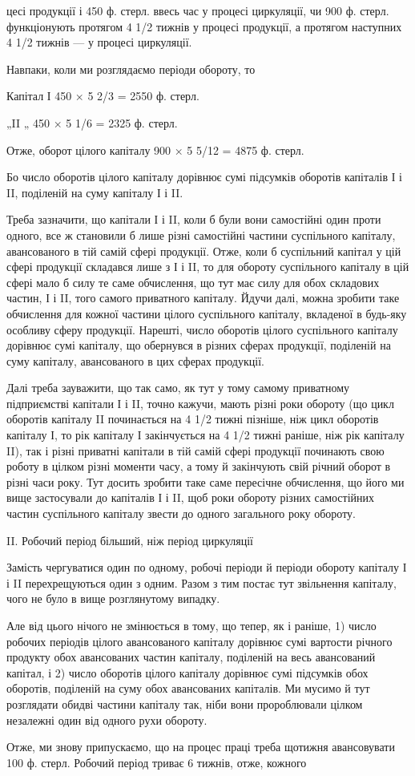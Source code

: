 цесі продукції і 450 ф. стерл. ввесь час у процесі циркуляції, чи 900 ф.
стерл. функціонують протягом 4 1/2 тижнів у процесі продукції, а протягом
наступних 4 1/2 тижнів — у процесі циркуляції.

Навпаки, коли ми розглядаємо періоди обороту, то

Капітал І 450 × 5 2/3 = 2550 ф. стерл.

„II „ 450 × 5 1/6 = 2325 ф. стерл.

Отже, оборот цілого капіталу 900 × 5 5/12 = 4875 ф. стерл.

Бо число оборотів цілого капіталу дорівнює сумі підсумків оборотів капіталів
І і II, поділеній на суму капіталу І і II.

Треба зазначити, що капітали І і II, коли б були вони самостійні
один проти одного, все ж становили б лише різні самостійні частини суспільного
капіталу, авансованого в тій самій сфері продукції. Отже, коли б
суспільний капітал у цій сфері продукції складався лише з І і II, то для
обороту суспільного капіталу в цій сфері мало б силу те саме обчислення,
що тут має силу для обох складових частин, І і II, того самого
приватного капіталу. Йдучи далі, можна зробити таке обчислення для
кожної частини цілого суспільного капіталу, вкладеної в будь-яку особливу
сферу продукції. Нарешті, число оборотів цілого суспільного капіталу
дорівнює сумі капіталу, що обернувся в різних сферах продукції,
поділеній на суму капіталу, авансованого в цих сферах продукції.

Далі треба зауважити, що так само, як тут у тому самому приватному
підприємстві капітали І і II, точно кажучи, мають різні роки обороту
(що цикл оборотів капіталу II починається на 4 1/2 тижні пізніше, ніж
цикл оборотів капіталу І, то рік капіталу І закінчується на 4 1/2 тижні
раніше, ніж рік капіталу II), так і різні приватні капітали в тій самій
сфері продукції починають свою роботу в цілком різні моменти часу,
а тому й закінчують свій річний оборот в різні часи року. Тут досить
зробити таке саме пересічне обчислення, що його ми вище застосували
до капіталів І і II, щоб роки обороту різних самостійних частин суспільного
капіталу звести до одного загального року обороту.

II. Робочий період більший, ніж період циркуляції

Замість чергуватися один по одному, робочі періоди й періоди обороту
капіталу І і II перехрещуються один з одним. Разом з тим постає
тут звільнення капіталу, чого не було в вище розглянутому випадку.

Але від цього нічого не змінюється в тому, що тепер, як і раніше,
1) число робочих періодів цілого авансованого капіталу дорівнює сумі
вартости річного продукту обох авансованих частин капіталу, поділеній
на весь авансований капітал, і 2) число оборотів цілого капіталу дорівнює
сумі підсумків обох оборотів, поділеній на суму обох авансованих
капіталів. Ми мусимо й тут розглядати обидві частини капіталу так, ніби
вони пророблювали цілком незалежні один від одного рухи обороту.

Отже, ми знову припускаємо, що на процес праці треба щотижня
авансовувати 100 ф. стерл. Робочий період триває 6 тижнів, отже, кожного
